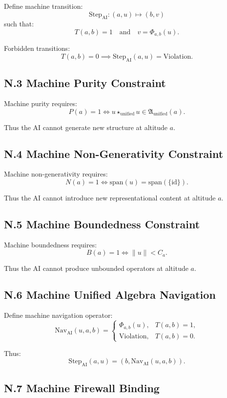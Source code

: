 Define machine transition:
\[
\mathrm{Step}_{\mathrm{AI}} :
(a,u) \mapsto (b,v)
\]
such that:
\[
T(a,b)=1
\quad\text{and}\quad
v = \Phi_{a,b}(u).
\]

Forbidden transitions:
\[
T(a,b)=0 \implies \mathrm{Step}_{\mathrm{AI}}(a,u) = \mathrm{Violation}.
\]

\subsection*{N.3 Machine Purity Constraint}

Machine purity requires:
\[
P(a)=1 \iff
u \star_{\mathrm{unified}} u \in \mathfrak{A}_{\mathrm{unified}}(a).
\]

Thus the AI cannot generate new structure at altitude $a$.

\subsection*{N.4 Machine Non-Generativity Constraint}

Machine non-generativity requires:
\[
N(a)=1 \iff
\mathrm{span}(u) = \mathrm{span}(\{\mathrm{id}\}).
\]

Thus the AI cannot introduce new representational content at altitude $a$.

\subsection*{N.5 Machine Boundedness Constraint}

Machine boundedness requires:
\[
B(a)=1 \iff
\|u\| < C_a.
\]

Thus the AI cannot produce unbounded operators at altitude $a$.

\subsection*{N.6 Machine Unified Algebra Navigation}

Define machine navigation operator:
\[
\mathrm{Nav}_{\mathrm{AI}}(u,a,b)
=
\begin{cases}
\Phi_{a,b}(u), & T(a,b)=1, \\
\mathrm{Violation}, & T(a,b)=0.
\end{cases}
\]

Thus:
\[
\mathrm{Step}_{\mathrm{AI}}(a,u)
=
(b,\mathrm{Nav}_{\mathrm{AI}}(u,a,b)).
\]

\subsection*{N.7 Machine Firewall Binding}

